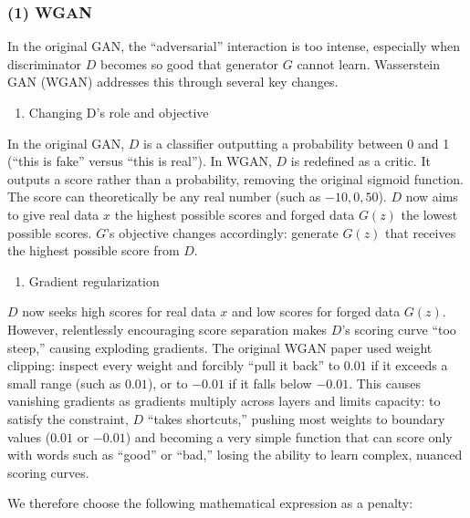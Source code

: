 \hypertarget{wgan}{%
\subsubsection{(1) WGAN}\label{wgan}}

In the original GAN, the ``adversarial'' interaction is too intense, especially when discriminator \(D\) becomes so good that generator \(G\) cannot learn. Wasserstein GAN (WGAN) addresses this through several key changes.

\begin{enumerate}
\def\labelenumi{\arabic{enumi}.}
\tightlist
\item
  Changing D's role and objective
\end{enumerate}

In the original GAN, \(D\) is a classifier outputting a probability between 0 and 1 (``this is fake'' versus ``this is real''). In WGAN, \(D\) is redefined as a critic. It outputs a score rather than a probability, removing the original sigmoid function. The score can theoretically be any real number (such as \(-10, 0, 50\)). \(D\) now aims to give real data \(x\) the highest possible scores and forged data \(G(z)\) the lowest possible scores. \(G\)'s objective changes accordingly: generate \(G(z)\) that receives the highest possible score from \(D\).

\begin{enumerate}
\def\labelenumi{\arabic{enumi}.}
\setcounter{enumi}{1}
\tightlist
\item
  Gradient regularization
\end{enumerate}

\(D\) now seeks high scores for real data \(x\) and low scores for forged data \(G(z)\). However, relentlessly encouraging score separation makes \(D\)'s scoring curve ``too steep,'' causing exploding gradients. The original WGAN paper used weight clipping: inspect every weight and forcibly ``pull it back'' to \(0.01\) if it exceeds a small range (such as \(0.01\)), or to \(-0.01\) if it falls below \(-0.01\). This causes vanishing gradients as gradients multiply across layers and limits capacity: to satisfy the constraint, \(D\) ``takes shortcuts,'' pushing most weights to boundary values (\(0.01\) or \(-0.01\)) and becoming a very simple function that can score only with words such as ``good'' or ``bad,'' losing the ability to learn complex, nuanced scoring curves.

We therefore choose the following mathematical expression as a penalty:

